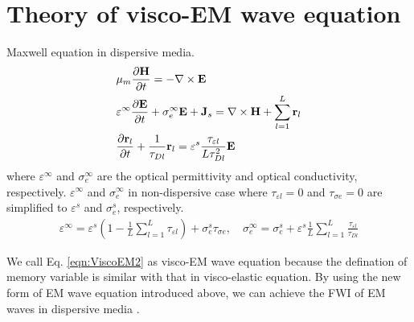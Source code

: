 \documentclass[pdftex,a4paper,parskip,listof=totoc,bibliography=totoc,onehalfspacing,12pt]{scrreprt}
\begin{document}
\section{Theory of visco-EM wave equation}
Maxwell equation in dispersive media.
\begin{equation}
\label{eqn:ViscoEM2}
\begin{align*}
  &\mu_{m} \pdv{ \mathbf{H}}{t} = -\nabla \times \mathbf{E} \\
  &\varepsilon^\infty_{} \pdv{ \mathbf{E}}{t} + \sigma^\infty_{e} \mathbf{E} + \mathbf{J}_s = \nabla \times \mathbf{H} + \sum_{l=1}^L \mathbf{r}_{l} \\
  &\pdv{\mathbf{r}_{l}}{t} + \frac{1}{\tau_{Dl}} \mathbf{r}_{l} = \varepsilon^s_{} \frac{\tau_{\varepsilon l }}{L \tau_{Dl}^2} \mathbf{E} 
\end{align*}
\end{equation}
where $\varepsilon^\infty_{}$ and $\sigma^\infty_{e}$ are the optical permittivity and optical conductivity, respectively. $\varepsilon^\infty_{}$ and $\sigma^\infty_{e}$ in non-dispersive case where $\tau_{\varepsilon l } = 0$ and $\tau_{\sigma e} = 0$ are simplified to $\varepsilon^s_{}$ and $\sigma^s_{e}$, respectively.
\begin{equation}
\label{eqn:ViscoParameter}
\begin{align*}
  \varepsilon^\infty_{} = \varepsilon^s_{} \left( 1-\frac{1 }{L} \sum_{l=1}^L \tau_{\varepsilon l } \right) + \sigma^s_{e} \tau_{\sigma e}, \quad
  \sigma^\infty_{e} = \sigma^s_{e} + \varepsilon^s_{} \frac{1 }{L} \sum_{l=1}^L \frac{\tau_{\varepsilon l }}{\tau_{Dl}}
\end{align*}
\end{equation} 
\par We call Eq. \ref{eqn:ViscoEM2} as visco-EM wave equation because the defination of memory variable is similar with that in visco-elastic equation. By using the new form of EM wave equation introduced above, we can achieve the FWI of EM waves in dispersive media \citep{qin2020full}.
\end{document}
